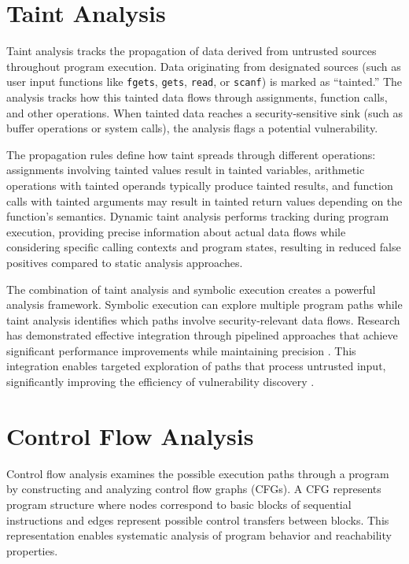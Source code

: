 \section{Taint Analysis}

Taint analysis tracks the propagation of data derived from untrusted sources throughout program execution. Data originating from designated sources (such as user input functions like \texttt{fgets}, \texttt{gets}, \texttt{read}, or \texttt{scanf}) is marked as ``tainted.'' The analysis tracks how this tainted data flows through assignments, function calls, and other operations. When tainted data reaches a security-sensitive sink (such as buffer operations or system calls), the analysis flags a potential vulnerability.

The propagation rules define how taint spreads through different operations: assignments involving tainted values result in tainted variables, arithmetic operations with tainted operands typically produce tainted results, and function calls with tainted arguments may result in tainted return values depending on the function's semantics. Dynamic taint analysis performs tracking during program execution, providing precise information about actual data flows while considering specific calling contexts and program states, resulting in reduced false positives compared to static analysis approaches.

The combination of taint analysis and symbolic execution creates a powerful analysis framework. Symbolic execution can explore multiple program paths while taint analysis identifies which paths involve security-relevant data flows. Research has demonstrated effective integration through pipelined approaches that achieve significant performance improvements while maintaining precision \cite{ming_taintpipe_2015}. This integration enables targeted exploration of paths that process untrusted input, significantly improving the efficiency of vulnerability discovery \cite{newsome_dynamic_2005}.

\section{Control Flow Analysis}

Control flow analysis examines the possible execution paths through a program by constructing and analyzing control flow graphs (CFGs). A CFG represents program structure where nodes correspond to basic blocks of sequential instructions and edges represent possible control transfers between blocks. This representation enables systematic analysis of program behavior and reachability properties.

